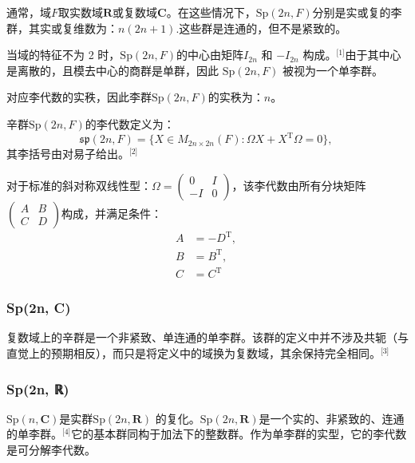 通常，域$F$取实数域$\mathbf{R}$或复数域$\mathbf{C}$。在这些情况下，$\mathrm{Sp}(2n, F)$分别是实或复的李群，其实或复维数为：$n(2n+1)$.这些群是连通的，但不是紧致的。

当域的特征不为 2 时，$\mathrm{Sp}(2n, F)$的中心由矩阵$I_{2n}$ 和 $-I_{2n}$ 构成。\(^\text{[1]}\)由于其中心是离散的，且模去中心的商群是单群，因此 $\mathrm{Sp}(2n, F)$ 被视为一个单李群。

对应李代数的实秩，因此李群$\mathrm{Sp}(2n, F)$的实秩为：$n$。

辛群$\mathrm{Sp}(2n, F)$的李代数定义为：
$$
\mathfrak{sp}(2n,F) = \{ X \in M_{2n \times 2n}(F) : \Omega X + X^{\mathrm{T}} \Omega = 0 \},~
$$
其李括号由对易子给出。\(^\text{[2]}\)

对于标准的斜对称双线性型：$\Omega = \begin{pmatrix}0 & I \\- I & 0
\end{pmatrix}$，该李代数由所有分块矩阵$\begin{pmatrix}A & B \\C & D
\end{pmatrix}$构成，并满足条件：
$$
\begin{aligned}
A &= - D^{\mathrm{T}}, \\
B &= B^{\mathrm{T}}, \\
C &= C^{\mathrm{T}}
\end{aligned}~
$$
\subsubsection{Sp(2n, C)}
复数域上的辛群是一个非紧致、单连通的单李群。该群的定义中并不涉及共轭（与直觉上的预期相反），而只是将定义中的域换为复数域，其余保持完全相同。\(^\text{[3]}\)
\subsubsection{Sp(2n, ℝ)}
$\mathrm{Sp}(n, \mathbf{C})$是实群$\mathrm{Sp}(2n, \mathbf{R})$ 的复化。$\mathrm{Sp}(2n, \mathbf{R})$是一个实的、非紧致的、连通的单李群。\(^\text{[4]}\)它的基本群同构于加法下的整数群。作为单李群的实型，它的李代数是可分解李代数。

